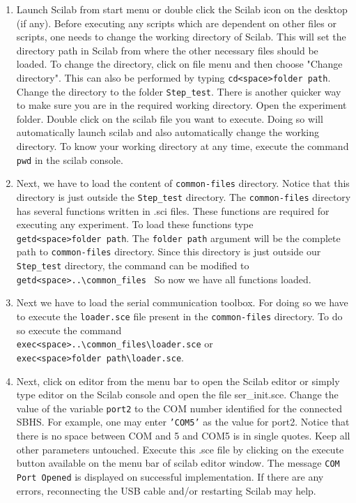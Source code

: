 \begin{enumerate}
\item Launch Scilab from start menu or double click the Scilab icon on the desktop (if any). Before executing any scripts which are dependent on other files or scripts, one needs to change the working directory of Scilab. This will set the directory path in Scilab from where the other necessary files should be loaded.  To change the directory, click on file menu and then choose "Change directory". This can also be performed by typing {\tt cd<space>folder path}. Change the directory to the folder  {\tt Step\_test}. There is another quicker way to make sure you are in the required working directory. Open the experiment folder. Double click on the scilab file you want to execute. Doing so will automatically launch scilab and also automatically change the working directory. To know your working directory at any time, execute the command {\tt pwd} in the scilab console. 
\item Next, we have to load the content of {\tt common-files} directory. Notice that this directory is just outside the {\tt Step\_test} directory. The  {\tt common-files} directory has several functions written in .sci files. These functions are required for executing any experiment. To load these functions type \\{\tt getd<space>folder path}. The {\tt folder path} argument will be the complete path to {\tt common-files} directory. Since this directory is just outside our {\tt Step\_test} directory, the command can be modified to \\{\tt getd<space>..\textbackslash common\_files\ } So now we have all functions loaded. 
\item Next we have to load the serial communication toolbox. For doing so we have to execute the {\tt loader.sce} file present in the {\tt common-files} directory. To do so execute the command \\{\tt exec<space>..\textbackslash common\_files\textbackslash loader.sce} or\\ {\tt exec<space>folder path\textbackslash loader.sce}. 
\item Next, click on {\ttfamily editor} from the menu bar to open the Scilab editor or simply type {\ttfamily editor} on the Scilab console and open the file {\ttfamily ser\_init.sce}. Change the value of the variable {\tt port2} to the COM number identified for the connected SBHS. For example, one may enter {\tt 'COM5'} as the value for port2. Notice that there is no space between COM and 5 and COM5 is in single quotes.  Keep all other parameters untouched. Execute this .sce file by clicking on the execute button available on the menu bar of scilab editor window. The message {\tt COM Port Opened} is displayed on successful implementation. If there are any errors, reconnecting the USB cable and/or restarting Scilab may help.

\end{enumerate}
